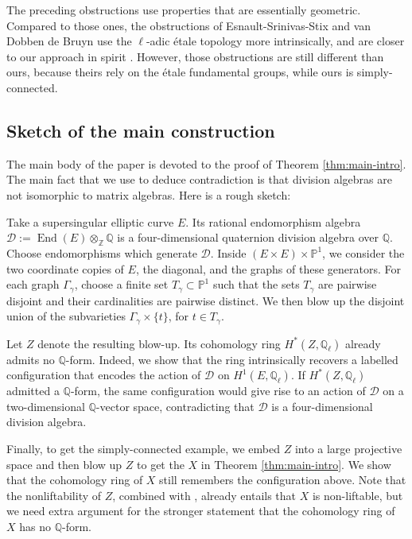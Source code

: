 \documentclass[11pt, reqno]{amsart}
\theoremstyle{definition}
\newcommand\QQ{\mathbb{Q}}
\newcommand\PP{\mathbb{P}}
\DeclareMathOperator{\et}{\acute{e}t}
\DeclareMathOperator{\End}{End}
\begin{document}
The preceding obstructions use properties that are essentially geometric.
Compared to those ones, the obstructions of Esnault-Srinivas-Stix and van Dobben de Bruyn use the $\ell$-adic \'etale  topology more intrinsically, and are closer to our approach in spirit \cites{Esnault-Srinivas-Stix-fundamental-group, van-Dobben-de-Bruyn-more}.
However, those obstructions are still different than ours, because theirs rely on the \'etale fundamental groups, while ours is simply-connected.


\subsection*{Sketch of the main construction}\;

The main body of the paper is devoted to the proof of Theorem \ref{thm:main-intro}. 
The main fact that we use to deduce contradiction is that division algebras are not isomorphic to matrix algebras.
Here is a rough sketch:

Take a supersingular elliptic curve $E$.
Its rational endomorphism algebra 
 $\mathcal D:=\End(E)\otimes_{\mathbb{Z}}\mathbb{Q}$
is a four-dimensional quaternion division algebra over $\QQ$.  Choose
endomorphisms which generate $\mathcal D$.  Inside
$(E\times E)\times\PP^1$, we consider the two coordinate copies of $E$,
the diagonal, and the graphs of these generators.  
For each graph $\Gamma_\gamma$, choose a finite set
$T_\gamma\subset\PP^1$ such that the sets $T_\gamma$ are pairwise
disjoint and their cardinalities are pairwise distinct.  We then blow up the disjoint union of the subvarieties
$\Gamma_\gamma\times\{t\}$, for $t\in T_\gamma$.

Let $Z$ denote the resulting blow-up.  Its cohomology ring
$H^*_{\et}(Z,\QQ_\ell)$ already admits no $\QQ$-form.  Indeed, we 
show that the ring intrinsically recovers a labelled configuration that encodes the
action of $\mathcal D$ on $H^1_{\et}(E,\QQ_\ell)$.
If $H^*_{\et}(Z,\QQ_\ell)$ admitted a $\QQ$-form, the same configuration would give rise to an action of $\mathcal D$ on a two-dimensional $\QQ$-vector space, contradicting that $\mathcal D$ is a four-dimensional division algebra.


Finally, to get the simply-connected example, we embed $Z$ into a large projective space and then blow up $Z$ to get the $X$ in Theorem \ref{thm:main-intro}.
We show that the cohomology ring of $X$ still remembers the configuration above. 
Note that the nonliftability of $Z$, combined with \cite[Proposition~4.3]{Achinger-Zdanowicz-more}, already entails that $X$ is non-liftable, but we need extra argument for the stronger statement that the cohomology ring of $X$ has no $\QQ$-form.
\end{document}

